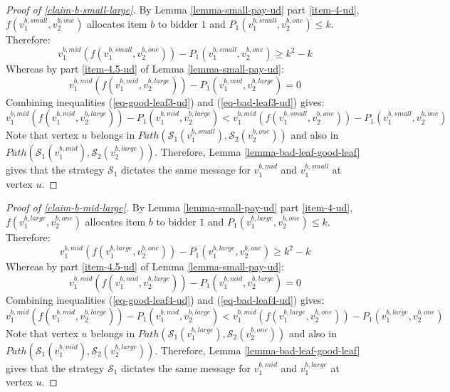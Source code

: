 \begin{proof}[Proof of \cref{claim-b-small-large}]
        By Lemma \ref{lemma-small-pay-ud} part \ref{item-4-ud}, $f(v_1^{b,small},v_2^{b,one})$ allocates item $b$ to bidder $1$ and $P_1(v_1^{b,small},\allowbreak v_2^{b,one})\le k$. Therefore:
\begin{equation}\label{eq-good-leaf3-ud}
 v_1^{b,mid}(f(v_1^{b,small},v_2^{b,one}))-P_1(v_1^{b,small},v_2^{b,one})\ge k^2-k   
\end{equation}
Whereas by part \ref{item-4.5-ud} of Lemma \ref{lemma-small-pay-ud}: 
 \begin{equation}\label{eq-bad-leaf3-ud}
 v_1^{b,mid}(f(v_1^{b,mid},v_2^{b,large}))-P_1(v_1^{b,mid},v_2^{b,large})= 0   
\end{equation}
Combining inequalities (\ref{eq-good-leaf3-ud}) and (\ref{eq-bad-leaf3-ud}) gives:
\begin{equation*}
 v_1^{b,mid}(f(v_1^{b,mid},v_2^{b,large}))-P_1(v_1^{b,mid},v_2^{b,large})< 
v_1^{b,mid}(f(v_1^{b,small},v_2^{b,one}))-P_1(v_1^{b,small},v_2^{b,one})
\end{equation*}
Note that vertex $u$ belongs in $Path(\mathcal S_1(v_1^{b,small}),\mathcal S_2(v_2^{b,one}))$ and also in
$Path(\mathcal{S}_1(v_1^{b,mid}),\allowbreak\mathcal{S}_2(v_2^{b,large}))$. Therefore, Lemma \ref{lemma-bad-leaf-good-leaf} gives that the strategy $\mathcal S_1$ dictates the same message for  $v_1^{b,mid}$ and $v_1^{b,small}$ at vertex $u$.
\end{proof}
\begin{proof}[Proof of \cref{claim-b-mid-large}]
          By Lemma \ref{lemma-small-pay-ud} part \ref{item-4-ud}, $f(v_1^{b,large},v_2^{b,one})$ allocates item $b$ to bidder $1$ and $P_1(v_1^{b,large},\allowbreak v_2^{b,one})\le k$. Therefore:
\begin{equation}\label{eq-good-leaf4-ud}
 v_1^{b,mid}(f(v_1^{b,large},v_2^{b,one}))-P_1(v_1^{b,large},v_2^{b,one})\ge k^2-k   
\end{equation}
Whereas by part \ref{item-4.5-ud} of Lemma \ref{lemma-small-pay-ud}: 
 \begin{equation}\label{eq-bad-leaf4-ud}
 v_1^{b,mid}(f(v_1^{b,mid},v_2^{b,large}))-P_1(v_1^{b,mid},v_2^{b,large})= 0   
\end{equation}
Combining inequalities (\ref{eq-good-leaf4-ud}) and (\ref{eq-bad-leaf4-ud}) gives:
\begin{equation*}
 v_1^{b,mid}(f(v_1^{b,mid},v_2^{b,large}))-P_1(v_1^{b,mid},v_2^{b,large})< 
v_1^{b,mid}(f(v_1^{b,large},v_2^{b,one}))-P_1(v_1^{b,large},v_2^{b,one})
\end{equation*}
Note that vertex $u$ belongs in $Path(\mathcal S_1(v_1^{b,large}),\mathcal S_2(v_2^{b,one}))$ and also in
$Path(\mathcal{S}_1(v_1^{b,mid}),\allowbreak\mathcal{S}_2(v_2^{b,large}))$. Therefore, Lemma \ref{lemma-bad-leaf-good-leaf} gives that the strategy $\mathcal S_1$ dictates the same message for  $v_1^{b,mid}$ and $v_1^{b,large}$ at vertex $u$.
\end{proof}
